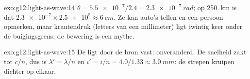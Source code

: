 \begin{solution}{exo:g12:light-as-wave:14}
$\theta = \num{5.5e-7}/2.4 = \qty{2.3e-7}{rad}$; op \qty{250}{km} is dat
$\num{2.3e-7} \times \num{2.5e5} \approx \qty{6}{cm}$. Ze kan auto's
tellen en een persoon opmerken, maar krantendruk (letters van een
millimeter) ligt twintig keer onder de buigingsgrens: de bewering is een
mythe.
\end{solution}

\begin{solution}{exo:g12:light-as-wave:15}
De  ligt door de bron vast: onveranderd. De snelheid zakt tot
$c/n$, dus is $\lambda' = \lambda/n$ en
$i' = i/n = 4.0/1.33 \approx \qty{3.0}{mm}$: de strepen kruipen dichter
op elkaar.
\end{solution}

